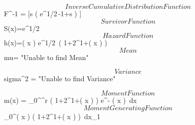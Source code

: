 \documentclass[12pt]{article}
\begin{document}
$$ Inverse Cumulative Distribution Function 
  $$F^{-1} = [s \left( {{\rm e}^{1/2\,{}}}-1+s \right) ]
$$Survivor Function 
 $$ S(x)={{\rm e}^{1/2\,{}}}
$$ Hazard Function 
 $$ h(x)=\cosh \left( x \right) {{\rm e}^{1/2\,{}}} \left( 1+{2}^{1+\sinh \left( x \right) } \right) 
$$Mean 
 $$ mu=                            "Unable to find Mean"

$$ Variance 
 $$ sigma^2 =                           "Unable to find Variance"

$$Moment Function 
 $$ m(x) = \int_{0}^{\infty }^{r} \left( 1+{2}^{1+\sinh \left( x \right) }
 \right) {{\rm e}^{-{}}
}\cosh \left( x \right) \,{\rm d}x
$$ Moment Generating Function 
 $$\int_{0}^{\infty }\cosh \left( x \right) 
 \left( 1+{2}^{1+\sinh \left( x \right) } \right) \,{\rm d}x_{{1}}
$$
\end{document}
